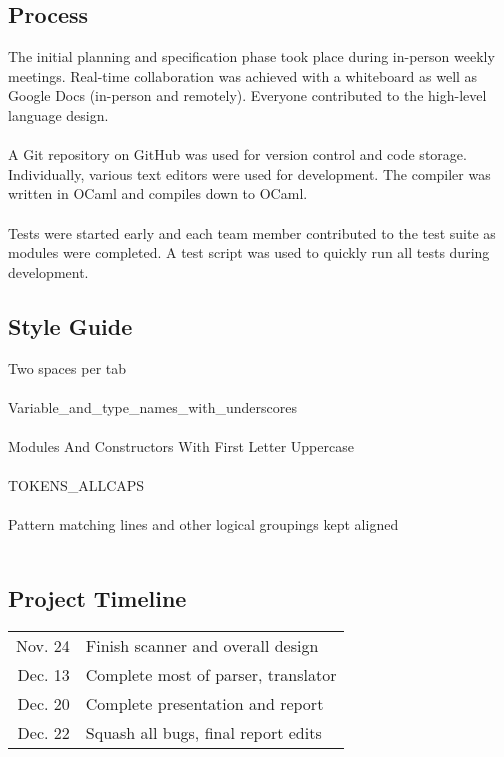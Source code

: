 
\subsection{Process}

The initial planning and specification phase took place during in-person weekly meetings. Real-time collaboration was achieved with a whiteboard as well as Google Docs (in-person and remotely). Everyone contributed to the high-level language design.\\\\
A Git repository on GitHub was used for version control and code storage. Individually, various text editors were used for development. The compiler was written in OCaml and compiles down to OCaml.\\\\
Tests were started early and each team member contributed to the test suite as modules were completed. A test script was used to quickly run all tests during development.

\subsection{Style Guide}

Two spaces per tab\\\\
Variable\_and\_type\_names\_with\_underscores\\\\
Modules And Constructors With First Letter Uppercase\\\\
TOKENS\_ALLCAPS\\\\
Pattern matching lines and other logical groupings kept aligned\\\\

\subsection{Project Timeline}
\begin{tabular}{r l}
Nov. 24 & Finish scanner and overall design\\
Dec. 13 & Complete most of parser, translator\\
Dec. 20 & Complete presentation and report\\
Dec. 22 & Squash all bugs, final report edits\\
\end{tabular}

